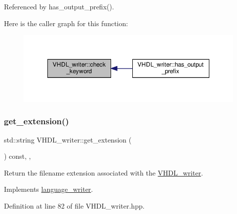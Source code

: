 Referenced by has\+\_\+output\+\_\+prefix().

Here is the caller graph for this function\+:
\nopagebreak
\begin{figure}[H]
\begin{center}
\leavevmode
\includegraphics[width=348pt]{d0/d0c/structVHDL__writer_a5c9eb93fec5f11553f37873b107dd739_icgraph}
\end{center}
\end{figure}
\mbox{\label{structVHDL__writer_aa4075167cf0d866eb3ffe02f3fcfb5c1}} 
\subsubsection{\texorpdfstring{get\+\_\+extension()}{get\_extension()}}
{\footnotesize\ttfamily std\+::string V\+H\+D\+L\+\_\+writer\+::get\+\_\+extension (\begin{DoxyParamCaption}{ }\end{DoxyParamCaption}) const\hspace{0.3cm}{\ttfamily [inline]}, {\ttfamily [override]}, {\ttfamily [virtual]}}



Return the filename extension associated with the \hyperlink{structVHDL__writer}{V\+H\+D\+L\+\_\+writer}. 



Implements \hyperlink{classlanguage__writer_a3bcb9c84b283d53ecc1f3c4ee8e9dc38}{language\+\_\+writer}.



Definition at line 82 of file V\+H\+D\+L\+\_\+writer.\+hpp.



